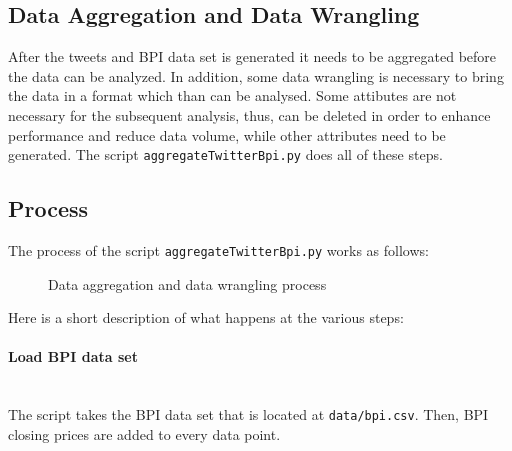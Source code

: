 \documentclass[a4paper,12pt]{article}
\begin{document}
\begin{spacing}{1.2}
\clearpage

\section{Data Aggregation and Data Wrangling}
After the tweets and BPI data set is generated it needs to be aggregated before the data can be analyzed. In addition, some data wrangling is necessary to bring the data in a format which than can be analysed. Some attibutes are not necessary for the subsequent analysis, thus, can be deleted in order to enhance performance and reduce data volume, while other attributes need to be generated. The script \verb|aggregateTwitterBpi.py| does all of these steps.

\subsection{Process}
The process of the script \verb|aggregateTwitterBpi.py| works as follows:
\begin{figure}[H]
\centering
\caption{Data aggregation and data wrangling process} \label{fig:dataaggregation}
\end{figure}

Here is a short description of what happens at the various steps: 
\paragraph{Load BPI data set}\mbox{}\\
The script takes the BPI data set that is located at \verb|data/bpi.csv|. Then, BPI closing prices are added to every data point.


\end{spacing}
\end{document}
